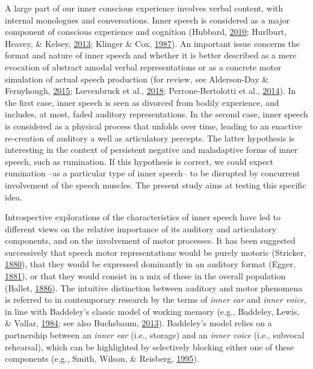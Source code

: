\documentclass[a4paper,12pt,twoside,openright,oldfontcommands]{memoir}
\begin{document}
A large part of our inner conscious experience involves verbal content, with internal monologues and conversations. Inner speech is considered as a major component of conscious experience and cognition (Hubbard, \protect\hyperlink{ref-hubbard_auditory_2010}{2010}; Hurlburt, Heavey, \& Kelsey, \protect\hyperlink{ref-Hurlburt2013}{2013}; Klinger \& Cox, \protect\hyperlink{ref-klinger_dimensions_1987}{1987}). An important issue concerns the format and nature of inner speech and whether it is better described as a mere evocation of abstract amodal verbal representations or as a concrete motor simulation of actual speech production (for review, see Alderson-Day \& Fernyhough, \protect\hyperlink{ref-alderson-day_inner_2015}{2015}; Lœvenbruck et al., \protect\hyperlink{ref-loevenbruck_cognitive_2018}{2018}; Perrone-Bertolotti et al., \protect\hyperlink{ref-Perrone-Bertolotti2014}{2014}). In the first case, inner speech is seen as divorced from bodily experience, and includes, at most, faded auditory representations. In the second case, inner speech is considered as a physical process that unfolds over time, leading to an enactive re-creation of auditory a well as articulatory percepts. The latter hypothesis is interesting in the context of persistent negative and maladaptive forms of inner speech, such as rumination. If this hypothesis is correct, we could expect rumination --as a particular type of inner speech-- to be disrupted by concurrent involvement of the speech muscles. The present study aims at testing this specific idea.

Introspective explorations of the characteristics of inner speech have led to different views on the relative importance of its auditory and articulatory components, and on the involvement of motor processes. It has been suggested successively that speech motor representations would be purely motoric (Stricker, \protect\hyperlink{ref-stricker_studien_1880}{1880}), that they would be expressed dominantly in an auditory format (Egger, \protect\hyperlink{ref-egger_parole_1881}{1881}), or that they would consist in a mix of these in the overall population (Ballet, \protect\hyperlink{ref-ballet_langage_1886}{1886}). The intuitive distinction between auditory and motor phenomena is referred to in contemporary research by the terms of \emph{inner ear} and \emph{inner voice}, in line with Baddeley's classic model of working memory (e.g., Baddeley, Lewis, \& Vallar, \protect\hyperlink{ref-baddeley_exploring_1984}{1984}; see also Buchsbaum, \protect\hyperlink{ref-buchsbaum_role_2013}{2013}). Baddeley's model relies on a partnership between an \emph{inner ear} (i.e., storage) and an \emph{inner voice} (i.e., subvocal rehearsal), which can be highlighted by selectively blocking either one of these components (e.g., Smith, Wilson, \& Reisberg, \protect\hyperlink{ref-smith_role_1995}{1995}).
\end{document}
